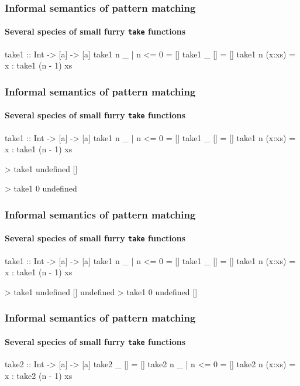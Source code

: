\documentclass{beamer}
\begin{document}
\begin{frame}[fragile]
  \frametitle{Informal semantics of pattern matching}
  \framesubtitle{Several species of small furry \texttt{take} functions}

  \begin{code}
take1 :: Int -> [a] -> [a]
take1 n _      | n <= 0 = []
take1 _ []              = []
take1 n (x:xs)          = x : take1 (n - 1) xs
  \end{code}
\end{frame}

\begin{frame}[fragile]
  \frametitle{Informal semantics of pattern matching}
  \framesubtitle{Several species of small furry \texttt{take} functions}

  \begin{code}
take1 :: Int -> [a] -> [a]
take1 n _      | n <= 0 = []
take1 _ []              = []
take1 n (x:xs)          = x : take1 (n - 1) xs
  \end{code}
  \begin{code}
> take1 undefined []

> take1 0 undefined

  \end{code}
\end{frame}

\begin{frame}[fragile]
  \frametitle{Informal semantics of pattern matching}
  \framesubtitle{Several species of small furry \texttt{take} functions}

  \begin{code}
take1 :: Int -> [a] -> [a]
take1 n _      | n <= 0 = []
take1 _ []              = []
take1 n (x:xs)          = x : take1 (n - 1) xs
  \end{code}
  \begin{code}
> take1 undefined []
undefined
> take1 0 undefined
[]
  \end{code}
\end{frame}

\begin{frame}[fragile]
  \frametitle{Informal semantics of pattern matching}
  \framesubtitle{Several species of small furry \texttt{take} functions}

  \begin{code}
take2 :: Int -> [a] -> [a]
take2 _ []              = []
take2 n _      | n <= 0 = []
take2 n (x:xs)          = x : take2 (n - 1) xs
  \end{code}
\end{frame}
\end{document}
